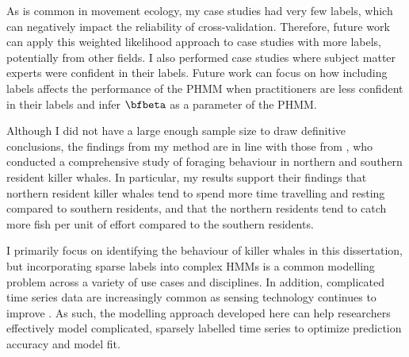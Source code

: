 As is common in movement ecology, my case studies had very few labels, which can negatively impact the reliability of cross-validation. Therefore, future work can apply this weighted likelihood approach to case studies with more labels, potentially from other fields. I also performed case studies where subject matter experts were confident in their labels. Future work can focus on how including labels affects the performance of the PHMM when practitioners are less confident in their labels and infer $\bfbeta$ as a parameter of the PHMM.

Although I did not have a large enough sample size to draw definitive conclusions, the findings from my method are in line with those from \citet{Tennessen:2023}, who conducted a comprehensive study of foraging behaviour in northern and southern resident killer whales. In particular, my results support their findings that northern resident killer whales tend to spend more time travelling and resting compared to southern residents, and that the northern residents tend to catch more fish per unit of effort compared to the southern residents. %

I primarily focus on identifying the behaviour of killer whales in this dissertation, but incorporating sparse labels into complex HMMs is a common modelling problem across a variety of use cases and disciplines. In addition, complicated time series data are increasingly common as sensing technology continues to improve \citep{Patterson:2017}. As such, the modelling approach developed here can help researchers effectively model complicated, sparsely labelled time series to optimize prediction accuracy and model fit.